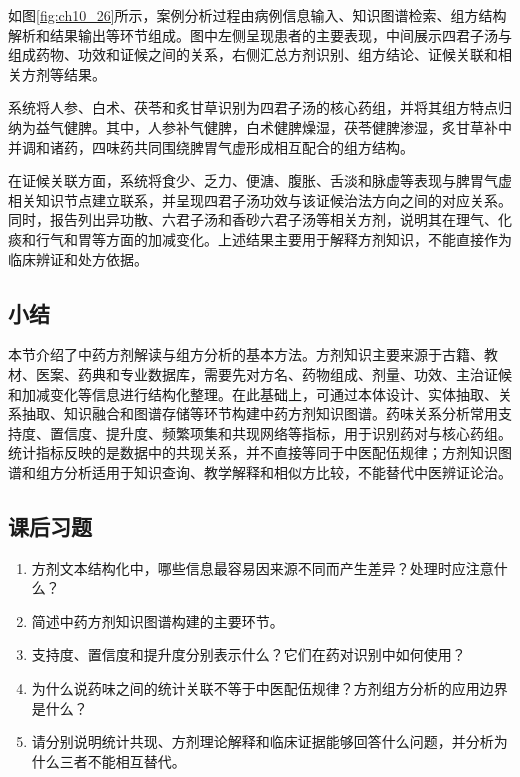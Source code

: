 如图\ref{fig:ch10_26}所示，案例分析过程由病例信息输入、知识图谱检索、组方结构解析和结果输出等环节组成。图中左侧呈现患者的主要表现，中间展示四君子汤与组成药物、功效和证候之间的关系，右侧汇总方剂识别、组方结论、证候关联和相关方剂等结果。

\par
\noindent\begin{minipage}{\textwidth}
\centering
{}
\label{fig:ch10_26}
\end{minipage}
\par

系统将人参、白术、茯苓和炙甘草识别为四君子汤的核心药组，并将其组方特点归纳为益气健脾。其中，人参补气健脾，白术健脾燥湿，茯苓健脾渗湿，炙甘草补中并调和诸药，四味药共同围绕脾胃气虚形成相互配合的组方结构。

在证候关联方面，系统将食少、乏力、便溏、腹胀、舌淡和脉虚等表现与脾胃气虚相关知识节点建立联系，并呈现四君子汤功效与该证候治法方向之间的对应关系。同时，报告列出异功散、六君子汤和香砂六君子汤等相关方剂，说明其在理气、化痰和行气和胃等方面的加减变化。上述结果主要用于解释方剂知识，不能直接作为临床辨证和处方依据。




\subsection*{小结}

本节介绍了中药方剂解读与组方分析的基本方法。方剂知识主要来源于古籍、教材、医案、药典和专业数据库，需要先对方名、药物组成、剂量、功效、主治证候和加减变化等信息进行结构化整理。在此基础上，可通过本体设计、实体抽取、关系抽取、知识融合和图谱存储等环节构建中药方剂知识图谱。药味关系分析常用支持度、置信度、提升度、频繁项集和共现网络等指标，用于识别药对与核心药组。统计指标反映的是数据中的共现关系，并不直接等同于中医配伍规律；方剂知识图谱和组方分析适用于知识查询、教学解释和相似方比较，不能替代中医辨证论治。

\bigskip
\subsection*{课后习题}
\begin{enumerate}
\setlength{\itemsep}{6pt}

\item 方剂文本结构化中，哪些信息最容易因来源不同而产生差异？处理时应注意什么？
\item 简述中药方剂知识图谱构建的主要环节。
\item 支持度、置信度和提升度分别表示什么？它们在药对识别中如何使用？
\item 为什么说药味之间的统计关联不等于中医配伍规律？方剂组方分析的应用边界是什么？
\item 请分别说明统计共现、方剂理论解释和临床证据能够回答什么问题，并分析为什么三者不能相互替代。
\end{enumerate}

